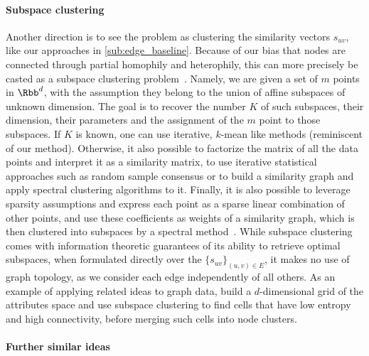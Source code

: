 \paragraph{Subspace clustering}
\label{par:erw_subs}

Another direction is to see the problem as clustering the similarity vectors $s_{uv}$, like our
approaches in \autoref{sub:edge_baseline}. Because of
our bias that nodes are connected through partial homophily and heterophily, this can more precisely
be casted as a subspace clustering problem~\autocite{SCSurvey11}. Namely, we are given a set of $m$
points in $\Rbb^d$, with the assumption they belong to the union of affine subspaces of unknown
dimension. The goal is to recover the number $K$ of such subspaces, their dimension, their
parameters and the assignment of the $m$ point to those subspaces. If $K$ is known, one can use
iterative, $k$-mean like methods (reminiscent of our \lloyd{} method). Otherwise, it also possible to
factorize the matrix of all the data points and interpret it as a similarity matrix, to use iterative
statistical approaches such as random sample consensus or to build a similarity graph and apply
spectral clustering algorithms to it. Finally, it is also possible to leverage sparsity assumptions and
express each point as a sparse linear combination of other points, and use these coefficients as
weights of a similarity graph, which is then clustered into subspaces by a spectral
method~\autocite{SparseSC13}.
While subspace clustering comes with information theoretic guarantees of its ability to retrieve
optimal subspaces, when formulated directly over the $\{s_{uv}\}_{(u,v) \in E}$, it makes no use of
graph topology, as we consider each edge independently of all others. As an example of applying
related ideas to graph data, \textcite{Huang2015} build a $d$-dimensional grid of the attributes
space and use subspace clustering to find cells that have low entropy and high connectivity, before
merging such cells into node clusters.

\paragraph{Further similar ideas}
\label{par:erw_misc}

